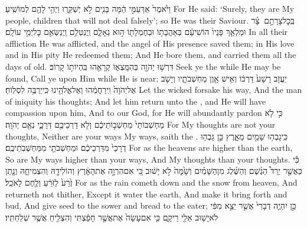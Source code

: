 {וַיֹּ֙אמֶר֙ אַךְ\maqqaf עַמִּ֣י הֵ֔מָּה בָּנִ֖ים לֹ֣א יְשַׁקֵּ֑רוּ וַיְהִ֥י לָהֶ֖ם לְמוֹשִֽׁיעַ׃}
{For He said: ‘Surely, they are My people, children that will not deal falsely’; so He was their Saviour.}
{בְּֽכׇל\maqqaf צָרָתָ֣ם \legarmeh  {} צָ֗ר וּמַלְאַ֤ךְ פָּנָיו֙ הוֹשִׁיעָ֔ם בְּאַהֲבָת֥וֹ וּבְחֶמְלָת֖וֹ ה֣וּא גְאָלָ֑ם וַֽיְנַטְּלֵ֥ם וַֽיְנַשְּׂאֵ֖ם כׇּל\maqqaf יְמֵ֥י עוֹלָֽם׃}
{In all their affliction He was afflicted, and the angel of His presence saved them; in His love and in His pity He redeemed them; And He bore them, and carried them all the days of old.}
\newperek
{}
\label{haft_52}
\setcounter{chap}{55}
\setcounter{verse}{6}
{דִּרְשׁ֥וּ יְהֹוָ֖ה בְּהִמָּֽצְא֑וֹ קְרָאֻ֖הוּ בִּֽהְיוֹת֥וֹ קָרֽוֹב׃}
{Seek ye the \lord\space while He may be found, Call ye upon Him while He is near;}
{יַעֲזֹ֤ב רָשָׁע֙ דַּרְכּ֔וֹ וְאִ֥ישׁ אָ֖וֶן מַחְשְׁבֹתָ֑יו וְיָשֹׁ֤ב אֶל\maqqaf יְהֹוָה֙ וִֽירַחֲמֵ֔הוּ וְאֶל\maqqaf אֱלֹהֵ֖ינוּ כִּֽי\maqqaf יַרְבֶּ֥ה לִסְלֽוֹחַ׃}
{Let the wicked forsake his way, And the man of iniquity his thoughts; And let him return unto the \lord, and He will have compassion upon him, And to our God, for He will abundantly pardon}
{כִּ֣י לֹ֤א מַחְשְׁבוֹתַי֙ מַחְשְׁב֣וֹתֵיכֶ֔ם וְלֹ֥א דַרְכֵיכֶ֖ם דְּרָכָ֑י נְאֻ֖ם יְהֹוָֽה׃}
{For My thoughts are not your thoughts, Neither are your ways My ways, saith the \lord.}
{כִּֽי\maqqaf גָבְה֥וּ שָׁמַ֖יִם מֵאָ֑רֶץ כֵּ֣ן גָּבְה֤וּ דְרָכַי֙ מִדַּרְכֵיכֶ֔ם וּמַחְשְׁבֹתַ֖י מִמַּחְשְׁבֹֽתֵיכֶֽם׃}
{For as the heavens are higher than the earth, So are My ways higher than your ways, And My thoughts than your thoughts.}
{כִּ֡י כַּאֲשֶׁ֣ר יֵרֵד֩ הַגֶּ֨שֶׁם וְהַשֶּׁ֜לֶג מִן\maqqaf הַשָּׁמַ֗יִם וְשָׁ֙מָּה֙ לֹ֣א יָשׁ֔וּב כִּ֚י אִם\maqqaf הִרְוָ֣ה אֶת\maqqaf הָאָ֔רֶץ וְהוֹלִידָ֖הּ וְהִצְמִיחָ֑הּ וְנָ֤תַן זֶ֙רַע֙ לַזֹּרֵ֔עַ וְלֶ֖חֶם לָאֹכֵֽל׃}
{For as the rain cometh down and the snow from heaven, And returneth not thither, Except it water the earth, And make it bring forth and bud, And give seed to the sower and bread to the eater;}
{כֵּ֣ן יִהְיֶ֤ה דְבָרִי֙ אֲשֶׁ֣ר יֵצֵ֣א מִפִּ֔י לֹא\maqqaf יָשׁ֥וּב אֵלַ֖י רֵיקָ֑ם כִּ֤י אִם\maqqaf עָשָׂה֙ אֶת\maqqaf אֲשֶׁ֣ר חָפַ֔צְתִּי וְהִצְלִ֖יחַ אֲשֶׁ֥ר שְׁלַחְתִּֽיו׃}
